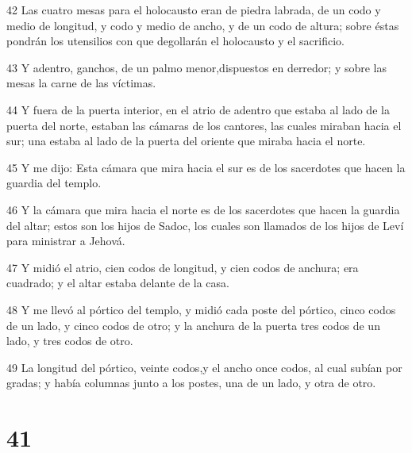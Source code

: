\par 42 Las cuatro mesas para el holocausto eran de piedra labrada, de un codo y medio de longitud, y codo y medio de ancho, y de un codo de altura; sobre éstas pondrán los utensilios con que degollarán el holocausto y el sacrificio. 
\par 43 Y adentro, ganchos, de un palmo menor,dispuestos en derredor; y sobre las mesas la carne de las víctimas.
\par 44 Y fuera de la puerta interior, en el atrio de adentro que estaba al lado de la puerta del norte, estaban las cámaras de los cantores, las cuales miraban hacia el sur; una estaba al lado de la puerta del oriente que miraba hacia el norte.
\par 45 Y me dijo: Esta cámara que mira hacia el sur es de los sacerdotes que hacen la guardia del templo.
\par 46 Y la cámara que mira hacia el norte es de los sacerdotes que hacen la guardia del altar; estos son los hijos de Sadoc, los cuales son llamados de los hijos de Leví para ministrar a Jehová.
\par 47 Y midió el atrio, cien codos de longitud, y cien codos de anchura; era cuadrado; y el altar estaba delante de la casa.
\par 48 Y me llevó al pórtico del templo, y midió cada poste del pórtico, cinco codos de un lado, y cinco codos de otro; y la anchura de la puerta tres codos de un lado, y tres codos de otro.
\par 49 La longitud del pórtico, veinte codos,y el ancho once codos, al cual subían por gradas; y había columnas junto a los postes, una de un lado, y otra de otro.

\chapter{41}

